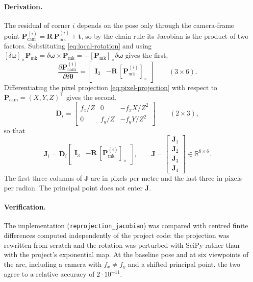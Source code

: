 \documentclass[11pt,a4paper]{article}
\theoremstyle{definition}
\theoremstyle{plain}
\theoremstyle{remark}
\newcommand{\code}[1]{\texttt{#1}}
\newcommand{\R}{\mathbb{R}}
\newcommand{\Pcam}{\mathbf{P}_{\text{cam}}}
\newcommand{\Pmark}{\mathbf{P}_{\text{mk}}}
\begin{document}
\paragraph{Derivation.} The residual of corner $i$ depends on the pose only
through the camera-frame point $\Pcam^{(i)} = \mathbf{R}\,\Pmark^{(i)} +
\mathbf{t}$, so by the chain rule its Jacobian is the product of two factors.
Substituting \eqref{eq:local-rotation} and using
$[\delta\boldsymbol{\omega}]_\times\Pmark = \delta\boldsymbol{\omega}\times\Pmark
= -[\Pmark]_\times\delta\boldsymbol{\omega}$ gives the first,
\begin{equation}
  \frac{\partial \Pcam^{(i)}}{\partial \delta\boldsymbol{\theta}}
  = \begin{bmatrix}\mathbf{I}_3 & -\mathbf{R}\,[\Pmark^{(i)}]_\times\end{bmatrix}
  \qquad (3\times6).
\end{equation}
Differentiating the pixel projection \eqref{eq:pixel-projection} with respect to
$\Pcam = (X,Y,Z)^\top$ gives the second,
\begin{equation}
  \mathbf{D}_i
  = \begin{bmatrix}
      f_x/Z & 0 & -f_x X/Z^2 \\[2pt]
      0 & f_y/Z & -f_y Y/Z^2
    \end{bmatrix}
  \qquad (2\times3),
\end{equation}
so that
\begin{equation}
  \boxed{\quad
  \mathbf{J}_i = \mathbf{D}_i
  \begin{bmatrix}\mathbf{I}_3 & -\mathbf{R}\,[\Pmark^{(i)}]_\times\end{bmatrix},
  \qquad
  \mathbf{J} = \begin{bmatrix}\mathbf{J}_1\\ \mathbf{J}_2\\ \mathbf{J}_3\\ \mathbf{J}_4\end{bmatrix}
  \in \R^{8\times6}.
  \quad}
  \label{eq:jacobian}
\end{equation}
The first three columns of $\mathbf{J}$ are in pixels per metre and the last
three in pixels per radian. The principal point does not enter $\mathbf{J}$.

\paragraph{Verification.} The implementation (\code{reprojection\_jacobian})
was compared with centred finite differences computed independently of the
project code: the projection was rewritten from scratch and the rotation was
perturbed with SciPy rather than with the project's exponential map. At the
baseline pose and at six viewpoints of the arc, including a camera with
$f_x \neq f_y$ and a shifted principal point, the two agree to a relative
accuracy of $2\cdot10^{-11}$.
\end{document}
